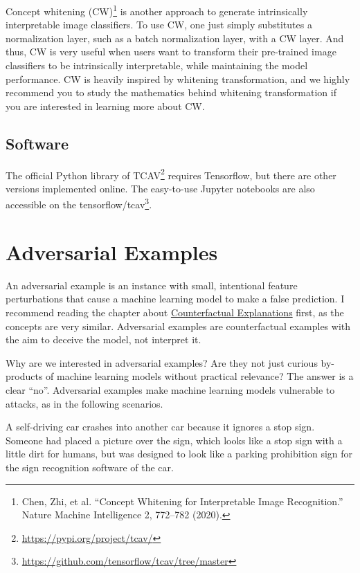 \documentclass[12pt,]{krantz}
\renewcommand{\href}[2]{#2\footnote{\url{#1}}}
\begin{document}
Concept whitening (CW)\footnote{Chen, Zhi, et al. ``Concept Whitening
  for Interpretable Image Recognition.'' Nature Machine Intelligence 2,
  772--782 (2020).} is another approach to generate intrinsically
interpretable image classifiers. To use CW, one just simply substitutes
a normalization layer, such as a batch normalization layer, with a CW
layer. And thus, CW is very useful when users want to transform their
pre-trained image classifiers to be intrinsically interpretable, while
maintaining the model performance. CW is heavily inspired by whitening
transformation, and we highly recommend you to study the mathematics
behind whitening transformation if you are interested in learning more
about CW.

\subsection{Software}\label{software-6}

The official Python library of
\href{https://pypi.org/project/tcav/}{TCAV} requires Tensorflow, but
there are other versions implemented online. The easy-to-use Jupyter
notebooks are also accessible on the
\href{https://github.com/tensorflow/tcav/tree/master}{tensorflow/tcav}.

\newpage

\hypertarget{adversarial}{\section{Adversarial
Examples}\label{adversarial}}

An adversarial example is an instance with small, intentional feature
perturbations that cause a machine learning model to make a false
prediction. I recommend reading the chapter about
\protect\hyperlink{counterfactual}{Counterfactual Explanations} first,
as the concepts are very similar. Adversarial examples are
counterfactual examples with the aim to deceive the model, not interpret
it.

Why are we interested in adversarial examples? Are they not just curious
by-products of machine learning models without practical relevance? The
answer is a clear ``no''. Adversarial examples make machine learning
models vulnerable to attacks, as in the following scenarios.

A self-driving car crashes into another car because it ignores a stop
sign. Someone had placed a picture over the sign, which looks like a
stop sign with a little dirt for humans, but was designed to look like a
parking prohibition sign for the sign recognition software of the car.
\end{document}
